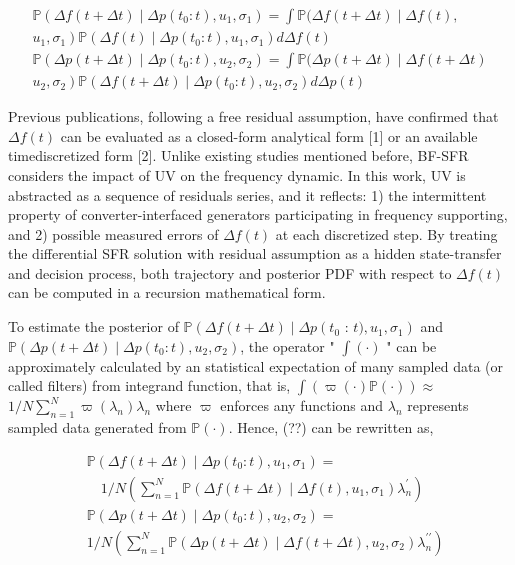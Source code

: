 \documentclass[lettersize,journal]{IEEEtran}
\begin{document}
$$
\begin{gathered}
\mathbb{P}\left(\Delta f(t+\Delta t) \mid \Delta p\left(t_{0}: t\right), u_{1}, \sigma_{1}\right)=\int \mathbb{P}(\Delta f(t+\Delta t) \mid \Delta f(t), \\
\left.u_{1}, \sigma_{1}\right) \mathbb{P}\left(\Delta f(t) \mid \Delta p\left(t_{0}: t\right), u_{1}, \sigma_{1}\right) d \Delta f(t) \\
\mathbb{P}\left(\Delta p(t+\Delta t) \mid \Delta p\left(t_{0}: t\right), u_{2}, \sigma_{2}\right)=\int \mathbb{P}(\Delta p(t+\Delta t) \mid \Delta f(t+\Delta t) \\
\left.u_{2}, \sigma_{2}\right) \mathbb{P}\left(\Delta f(t+\Delta t) \mid \Delta p\left(t_{0}: t\right), u_{2}, \sigma_{2}\right) d \Delta p(t)
\end{gathered}
$$

Previous publications, following a free residual assumption, have confirmed that $\Delta f(t)$ can be evaluated as a closed-form analytical form [1] or an available timediscretized form [2]. Unlike existing studies mentioned before, BF-SFR considers the impact of UV on the frequency dynamic. In this work, UV is abstracted as a sequence of residuals series, and it reflects: 1) the intermittent property of converter-interfaced generators participating in frequency supporting, and 2) possible measured errors of $\Delta f(t)$ at each discretized step. By treating the differential SFR solution with residual assumption as a hidden state-transfer and decision process, both trajectory and posterior PDF with respect to $\Delta f(t)$ can be computed in a recursion mathematical form.

To estimate the posterior of $\mathbb{P}\left(\Delta f(t+\Delta t) \mid \Delta p\left(t_{0}\right.\right.$ : $\left.t), u_{1}, \sigma_{1}\right)$ and $\mathbb{P}\left(\Delta p(t+\Delta t) \mid \Delta p\left(t_{0}: t\right), u_{2}, \sigma_{2}\right)$, the operator " $\int(\cdot)$ " can be approximately calculated by an statistical expectation of many sampled data (or called filters) from integrand function, that is, $\int(\varpi(\cdot) \mathbb{P}(\cdot)) \approx$ $1 / N \sum_{n=1}^{N} \varpi\left(\lambda_{n}\right) \lambda_{n}$ where $\varpi$ enforces any functions and $\lambda_{n}$ represents sampled data generated from $\mathbb{P}(\cdot)$. Hence, (??) can be rewritten as,

$$
\begin{aligned}
& \mathbb{P}\left(\Delta f(t+\Delta t) \mid \Delta p\left(t_{0}: t\right), u_{1}, \sigma_{1}\right)= \\
& \quad 1 / N\left(\sum_{n=1}^{N} \mathbb{P}\left(\Delta f(t+\Delta t) \mid \Delta f(t), u_{1}, \sigma_{1}\right) \lambda_{n}^{\prime}\right) \\
& \mathbb{P}\left(\Delta p(t+\Delta t) \mid \Delta p\left(t_{0}: t\right), u_{2}, \sigma_{2}\right)= \\
& 1 / N\left(\sum_{n=1}^{N} \mathbb{P}\left(\Delta p(t+\Delta t) \mid \Delta f(t+\Delta t), u_{2}, \sigma_{2}\right) \lambda_{n}^{\prime \prime}\right)
\end{aligned}
$$
\end{document}
